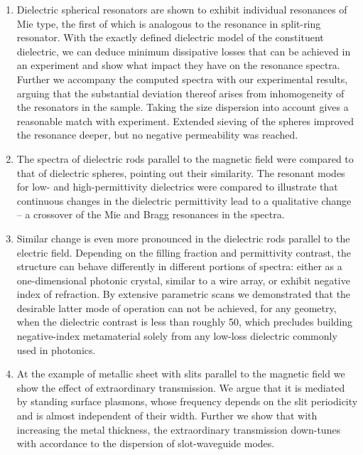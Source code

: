 \begin{enumerate}
{} 
\item{Dielectric spherical resonators are shown to exhibit individual resonances of Mie type, the first of which is analogous to the resonance in split-ring resonator. With the exactly defined dielectric model of the constituent dielectric, we can deduce minimum dissipative losses that can be achieved in an experiment and show what impact they have on the resonance spectra. Further we accompany the computed spectra with our experimental results, arguing that the substantial deviation thereof arises from inhomogeneity of the resonators in the sample. Taking the size dispersion into account gives a reasonable match with experiment. Extended sieving of the spheres improved the resonance deeper, but no negative permeability was reached.
} 
\item{The spectra of dielectric rods parallel to the magnetic field were compared to that of dielectric spheres, pointing out their similarity. The resonant modes for low- and high-permittivity dielectrics were compared to illustrate that continuous changes in the dielectric permittivity lead to a qualitative change -- a crossover of the Mie and Bragg resonances in the spectra.
} 
\item{Similar change is even more pronounced in the dielectric rods parallel to the electric field. Depending on the filling fraction and permittivity contrast, the structure can behave differently in different portions of spectra: either as a one-dimensional photonic crystal, similar to a wire array, or exhibit negative index of refraction. By extensive parametric scans we demonstrated that the desirable latter mode of operation  can not be achieved, for any geometry, when the dielectric contrast is less than roughly 50, which precludes building negative-index metamaterial solely from any low-loss dielectric commonly used in photonics. 
} 
\item{At the example of metallic sheet with slits parallel to the magnetic field we show the effect of extraordinary transmission. We argue that it is mediated by standing surface plasmons, whose frequency depends on the slit periodicity and is almost independent of their width. Further we show that with increasing the metal thickness, the extraordinary transmission down-tunes with accordance to the dispersion of slot-waveguide modes.
}
\end{enumerate}
